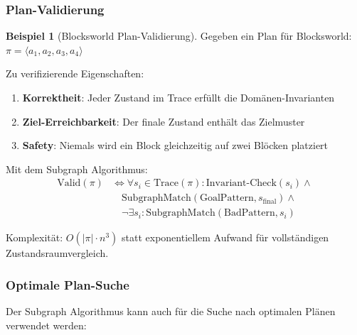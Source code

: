﻿\documentclass[a4paper,12pt]{article}
\theoremstyle{definition}
\newtheorem{beispiel}{Beispiel}[section]
\begin{document}
\subsubsection{Plan-Validierung}

\begin{beispiel}[Blocksworld Plan-Validierung]
	Gegeben ein Plan für Blocksworld: $\pi = \langle a_1, a_2, a_3, a_4 \rangle$
	
	Zu verifizierende Eigenschaften:
	\begin{enumerate}
		\item \textbf{Korrektheit}: Jeder Zustand im Trace erfüllt die Domänen-Invarianten
		\item \textbf{Ziel-Erreichbarkeit}: Der finale Zustand enthält das Zielmuster
		\item \textbf{Safety}: Niemals wird ein Block gleichzeitig auf zwei Blöcken platziert
	\end{enumerate}
	
	Mit dem Subgraph Algorithmus:
	\begin{align}
	\text{Valid}(\pi) &\iff \forall s_i \in \text{Trace}(\pi): \text{Invariant-Check}(s_i) \land \\
	&\quad \text{SubgraphMatch}(\text{GoalPattern}, s_{\text{final}}) \land \\
	&\quad \neg\exists s_i: \text{SubgraphMatch}(\text{BadPattern}, s_i)
	\end{align}
	
	Komplexität: $O(|\pi| \cdot n^3)$ statt exponentiellem Aufwand für vollständigen Zustandsraumvergleich.
\end{beispiel}

\subsubsection{Optimale Plan-Suche}

Der Subgraph Algorithmus kann auch für die Suche nach optimalen Plänen verwendet werden:
\end{document}

